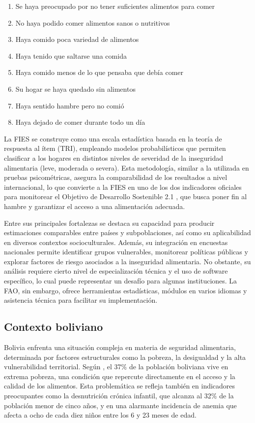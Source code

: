 \documentclass[Royal,times,sageh]{sagej}
\providecommand{\tightlist}{%
  \setlength{\itemsep}{0pt}\setlength{\parskip}{0pt}}
\begin{document}
\begin{enumerate}
\def\labelenumi{\arabic{enumi}.}
\tightlist
\item
  Se haya preocupado por no tener suficientes alimentos para comer
\item
  No haya podido comer alimentos sanos o nutritivos
\item
  Haya comido poca variedad de alimentos
\item
  Haya tenido que saltarse una comida
\item
  Haya comido menos de lo que pensaba que debía comer
\item
  Su hogar se haya quedado sin alimentos
\item
  Haya sentido hambre pero no comió
\item
  Haya dejado de comer durante todo un día
\end{enumerate}

La FIES se construye como una escala estadística basada en la teoría de
respuesta al ítem (TRI), empleando modelos probabilísticos que permiten
clasificar a los hogares en distintos niveles de severidad de la
inseguridad alimentaria (leve, moderada o severa). Esta metodología,
similar a la utilizada en pruebas psicométricas, asegura la
comparabilidad de los resultados a nivel internacional, lo que convierte
a la FIES en uno de los dos indicadores oficiales para monitorear el
Objetivo de Desarrollo Sostenible 2.1 \citet{unods2025}, que busca poner
fin al hambre y garantizar el acceso a una alimentación adecuada.

Entre sus principales fortalezas se destaca su capacidad para producir
estimaciones comparables entre países y subpoblaciones, así como su
aplicabilidad en diversos contextos socioculturales. Además, su
integración en encuestas nacionales permite identificar grupos
vulnerables, monitorear políticas públicas y explorar factores de riesgo
asociados a la inseguridad alimentaria. No obstante, su análisis
requiere cierto nivel de especialización técnica y el uso de software
específico, lo cual puede representar un desafío para algunas
instituciones. La FAO, sin embargo, ofrece herramientas estadísticas,
módulos en varios idiomas y asistencia técnica para facilitar su
implementación.

\subsection{Contexto boliviano}\label{contexto-boliviano}

Bolivia enfrenta una situación compleja en materia de seguridad
alimentaria, determinada por factores estructurales como la pobreza, la
desigualdad y la alta vulnerabilidad territorial. Según
\citet{mallea2014}, el 37\% de la población boliviana vive en extrema
pobreza, una condición que repercute directamente en el acceso y la
calidad de los alimentos. Esta problemática se refleja también en
indicadores preocupantes como la desnutrición crónica infantil, que
alcanza al 32\% de la población menor de cinco años, y en una alarmante
incidencia de anemia que afecta a ocho de cada diez niños entre los 6 y
23 meses de edad.
\end{document}
